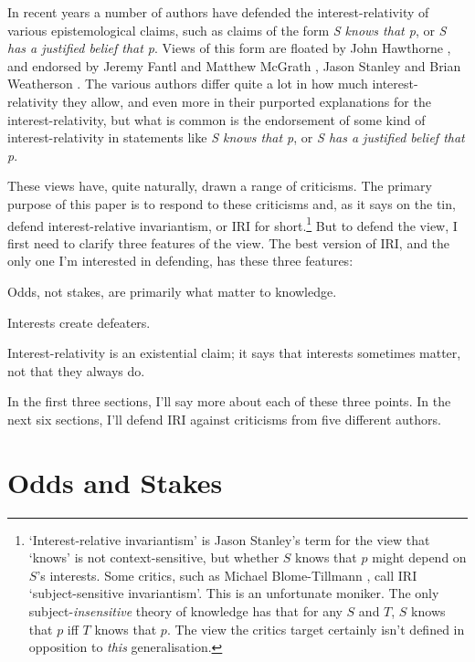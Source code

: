 \documentclass[oneside, a4paper]{book}
\begin{document}
\noindent In recent years a number of authors have defended the interest-relativity of various epistemological claims, such as claims of the form \textit{S knows that p}, or \textit{S has a justified belief that p}. Views of this form are floated by John Hawthorne \citeyearpar{Hawthorne2004}, and endorsed by Jeremy Fantl and Matthew McGrath \citeyearpar{Fantl2002, FantlMcGrath2009}, Jason Stanley \citeyearpar{Stanley2005-STAKAP} and Brian Weatherson \citeyearpar{Weatherson2005-WEACWD}. The various authors differ quite a lot in how much interest-relativity they allow, and even more in their purported explanations for the interest-relativity, but what is common is the endorsement of some kind of interest-relativity in statements like  \textit{S knows that p}, or \textit{S has a justified belief that p}.

These views have, quite naturally, drawn a range of criticisms. The primary purpose of this paper is to respond to these criticisms and, as it says on the tin, defend interest-relative invariantism, or IRI for short.\footnote{`Interest-relative invariantism' is Jason Stanley's term for the view that `knows' is not context-sensitive, but whether $S$ knows that $p$ might depend on $S$'s interests. Some critics, such as Michael Blome-Tillmann \citeyearpar{MBT2009}, call IRI `subject-sensitive invariantism'. This is an unfortunate moniker. The only subject-\textit{insensitive} theory of knowledge has that for any \(S\) and \(T\), \(S\) knows that \(p\) iff \(T\) knows that \(p\). The view the critics target certainly isn't defined in opposition to \textit{this} generalisation.} But to defend the view, I first need to clarify three features of the view. The best version of IRI, and the only one I'm interested in defending, has these three features:

\begin{itemize*}
\item Odds, not stakes, are primarily what matter to knowledge.
\item Interests create defeaters.
\item Interest-relativity is an existential claim; it says that interests sometimes matter, not that they always do.
\end{itemize*}

\noindent In the first three sections, I'll say more about each of these three points. In the next six sections, I'll defend IRI against criticisms from five different authors.

\section{Odds and Stakes}
\end{document}
